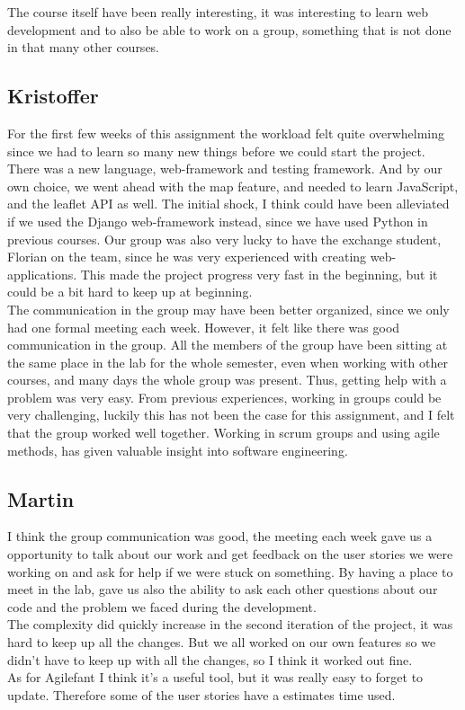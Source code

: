 \documentclass[a4paper]{article}
\begin{document}
\noindent
The course itself have been really interesting, it was interesting to learn web development and to  also be able to work on a group, something that is not done in that many other courses.

\subsection{Kristoffer}
\noindent
For the first few weeks of this assignment the workload felt quite overwhelming since we had to learn so many new things before we could start the project. There was a new language, web-framework and testing framework. And by our own choice, we went ahead with the map feature, and needed to learn JavaScript, and the leaflet API as well.  
The initial shock, I think could have been alleviated if we used the Django web-framework instead, since we have used Python in previous courses.
Our group was also very lucky to have the exchange student, Florian on the team, since he was very experienced with creating web-applications. This made the project progress very fast in the beginning, but it could be a bit hard to keep up at beginning. \\

\noindent
The communication in the group may have been better organized, since we only had one formal meeting each week. However, it felt like there was good communication in the group. All the members of the group have been sitting at the same place in the lab for the whole semester, even when working with other courses, and many days the whole group was present. Thus, getting help with a problem was very easy.
From previous experiences, working in groups could be very challenging, luckily this has not been the case for this assignment, and I felt that the group worked well together. Working in scrum groups and using agile methods, has given valuable insight into software engineering.  \\

\subsection{Martin}
I think the group communication was good, the meeting each week gave us a opportunity to talk about our work and get feedback on the user stories we were working on and ask for help if we were stuck on something. By having a place to meet in the lab, gave us also the ability to ask each other questions about our code and the problem we faced during the development. \\ 
The complexity did quickly increase in the second iteration of the project, it was hard to keep up all the changes. But we all worked on our own features so we didn't have to keep up with all the changes, so I think it worked out fine. \\
As for Agilefant I think it's a useful tool, but it was really easy to forget to update. Therefore some of the user stories have a estimates time used. \\
\end{document}
